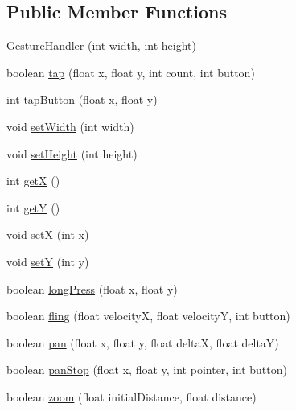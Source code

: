 \subsection*{Public Member Functions}
\begin{DoxyCompactItemize}
\item 
\hyperlink{classbattle_1_1logic_1_1_gesture_handler_af1fb848e131b2b7b807750ec72ce4e77}{Gesture\+Handler} (int width, int height)
\item 
boolean \hyperlink{classbattle_1_1logic_1_1_gesture_handler_a8546267d69673ee80b6b41480148a3cb}{tap} (float x, float y, int count, int button)
\item 
int \hyperlink{classbattle_1_1logic_1_1_gesture_handler_afb6655ac33143b73be0ea5c2b0ebcae6}{tap\+Button} (float x, float y)
\item 
void \hyperlink{classbattle_1_1logic_1_1_gesture_handler_a1b3b590860f31b98e8cf083304fcdf27}{set\+Width} (int width)
\item 
void \hyperlink{classbattle_1_1logic_1_1_gesture_handler_a80708ae66a7ae7850a190e94150dc70f}{set\+Height} (int height)
\item 
int \hyperlink{classbattle_1_1logic_1_1_gesture_handler_a1b26029ab29b186ae867bfa6e71d278a}{get\+X} ()
\item 
int \hyperlink{classbattle_1_1logic_1_1_gesture_handler_ae4522a517f6774b1d5182955b215e2a8}{get\+Y} ()
\item 
void \hyperlink{classbattle_1_1logic_1_1_gesture_handler_a50d9152779804b63c95ba215f566355a}{set\+X} (int x)
\item 
void \hyperlink{classbattle_1_1logic_1_1_gesture_handler_a7a2fdf5946b2fad08c54ebecbaa0d49b}{set\+Y} (int y)
\item 
boolean \hyperlink{classbattle_1_1logic_1_1_gesture_handler_a5dcf5b780e4caf681b22a16c7711ff64}{long\+Press} (float x, float y)
\item 
boolean \hyperlink{classbattle_1_1logic_1_1_gesture_handler_a854116b7d2c943642cf00eb6c48966c5}{fling} (float velocity\+X, float velocity\+Y, int button)
\item 
boolean \hyperlink{classbattle_1_1logic_1_1_gesture_handler_aa7e6838b252c83b3496009a881986b83}{pan} (float x, float y, float delta\+X, float delta\+Y)
\item 
boolean \hyperlink{classbattle_1_1logic_1_1_gesture_handler_afd35d645c298eb25d05766db90382cab}{pan\+Stop} (float x, float y, int pointer, int button)
\item 
boolean \hyperlink{classbattle_1_1logic_1_1_gesture_handler_a8e4645df194415fd1d978d1231125538}{zoom} (float initial\+Distance, float distance)

\end{DoxyCompactItemize}
